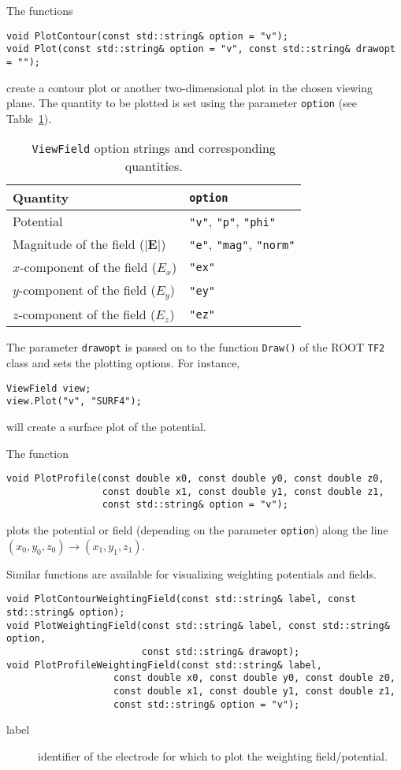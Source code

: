 The functions 
\begin{lstlisting}
void PlotContour(const std::string& option = "v");
void Plot(const std::string& option = "v", const std::string& drawopt = "");
\end{lstlisting}
create a contour plot or another two-dimensional plot in the chosen viewing plane.
The quantity to be plotted is set using the parameter \texttt{option} 
(see Table~\ref{Tab:ViewFieldOptionStrings}).
\begin{table}
  \centering
  \caption{\texttt{ViewField} option strings and corresponding quantities.}
  \label{Tab:ViewFieldOptionStrings}
  \begin{tabular}{l l} 
    \toprule
    Quantity & \texttt{option} \\
    \midrule
    Potential & \texttt{"v"}, \texttt{"p"}, \texttt{"phi"} \\
    Magnitude of the field ($\left|\mathbf{E}\right|$) & \texttt{"e"}, \texttt{"mag"}, \texttt{"norm"} \\
    $x$-component of the field ($E_{x}$) & \texttt{"ex"} \\ 
    $y$-component of the field ($E_{y}$) & \texttt{"ey"} \\ 
    $z$-component of the field ($E_{z}$) & \texttt{"ez"} \\ 
    \bottomrule
  \end{tabular}
\end{table}
The parameter \texttt{drawopt} is passed on to the function \texttt{Draw()} of the
ROOT \texttt{TF2} class and sets the plotting options. For instance,
\begin{lstlisting}
ViewField view;
view.Plot("v", "SURF4");
\end{lstlisting}
will create a surface plot of the potential.

The function 
\begin{lstlisting}
void PlotProfile(const double x0, const double y0, const double z0,
                 const double x1, const double y1, const double z1,
                 const std::string& option = "v");
\end{lstlisting}
plots the potential or field (depending on the parameter \texttt{option}) 
along the line  
\(\left(x_{0}, y_{0}, z_{0}\right) \rightarrow 
  \left(x_{1}, y_{1}, z_{1}\right)\).

Similar functions are available for visualizing weighting potentials and fields.
\begin{lstlisting}
void PlotContourWeightingField(const std::string& label, const std::string& option);
void PlotWeightingField(const std::string& label, const std::string& option,
                        const std::string& drawopt);
void PlotProfileWeightingField(const std::string& label,
                   const double x0, const double y0, const double z0,
                   const double x1, const double y1, const double z1,
                   const std::string& option = "v");
\end{lstlisting}
\begin{description}
  \item[label] identifier of the electrode for which to plot the weighting field/potential.
\end{description}

